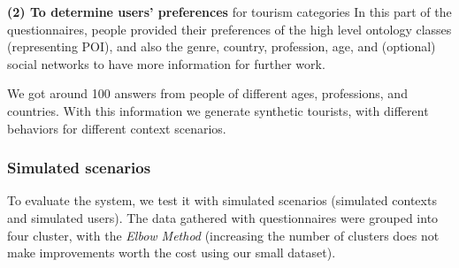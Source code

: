 \noindent
 {\bf (2) To determine users' preferences} for tourism categories %
 In this part of the questionnaires, people provided their preferences  of the high level ontology classes (representing POI), %
 and also the genre, country, profession, age, and (optional) social networks to have more information for further work.
 
    
    We got around 100 answers from people of different ages, professions, and countries.  With this information we generate
    synthetic tourists,
    with different behaviors for different context scenarios.
    

\vspace{-0.1cm}
\subsubsection{Simulated scenarios}
To evaluate the system, 
we test it with simulated scenarios (simulated contexts and simulated users).  
The data gathered with questionnaires were grouped into four cluster, with the \textit{Elbow Method} (increasing the number of clusters  does not make improvements worth the cost using our small dataset).




